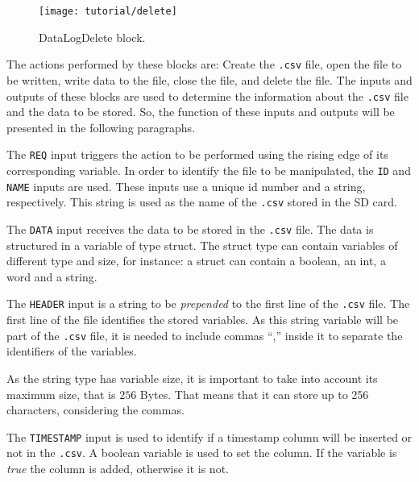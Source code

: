 \begin{figure}[H] \centering
\begin{minipage}{.45\textwidth}
  \centering
 \texttt{[image: tutorial/delete]}
  \caption{DataLogDelete block.}
  \label{fig:datalogdelete}
\end{minipage}
\end{figure}
The actions performed by these blocks are: Create the \verb|.csv| file, open the
file to be written, write data to the file, close the file, and delete the file. 
The inputs and outputs of these blocks are used to determine the information
about the \verb|.csv| file and the data to be stored.
So, the function
of these inputs and
outputs will be presented in the following paragraphs.

The \verb|REQ| input triggers the action to be performed using the rising edge
of its corresponding variable.
In order to identify the file to be manipulated, the \verb|ID| and \verb|NAME|
inputs are used. These inputs use a unique id number and a string, respectively. This string is used as the name of the
\verb|.csv| stored in the SD card.

The \verb|DATA| input receives the data to be stored in the \verb|.csv| file.
The data is structured in a variable of type struct. The struct type can contain variables of different type and size, for instance: a struct can contain a boolean,
an int, a word
and a string.

The \verb|HEADER| input is a string to be \emph{prepended} to the first line of
the \verb|.csv| file. The first line of the file identifies the
stored variables. As this string variable will be part of the \verb|.csv| file, it is needed to
include commas ``,'' inside it to separate the identifiers of the variables.

\begin{observation}
  \label{obs:stringSize}
 As the string type has variable size, it is important to take into account its
 maximum size, that is $256$ Bytes. That means that it can store up to 256 characters,
 considering the commas.
\end{observation}

The \verb|TIMESTAMP| input is used to identify if a timestamp column will be inserted or not in the \verb|.csv|. A boolean variable is
used to set the column. If the variable is \emph{true} the column is added, otherwise it
is not.

